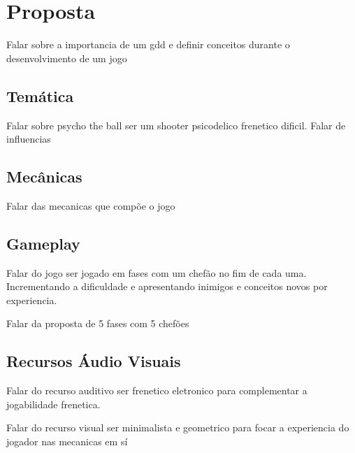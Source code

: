 
\chapter{Proposta}
\label{cap:proposta}

Falar sobre a importancia de um gdd e definir conceitos durante o desenvolvimento de um jogo

\section{Temática}
\label{sec:tematica}

Falar sobre psycho the ball ser um shooter psicodelico frenetico dificil. Falar de influencias

\section{Mecânicas}
\label{sec:mecanicas}

Falar das mecanicas que compõe o jogo

\section{Gameplay}
\label{sec:gameplay}

Falar do jogo ser jogado em fases com um chefão no fim de cada uma. Incrementando a dificuldade e apresentando inimigos e conceitos novos por experiencia.

Falar da proposta de 5 fases com 5 chefões

\section{Recursos Áudio Visuais}
\label{sec:audio_visuais}

Falar do recurso auditivo ser frenetico eletronico para complementar a jogabilidade frenetica.

Falar do recurso visual ser minimalista e geometrico para focar a experiencia do jogador nas mecanicas em sí
